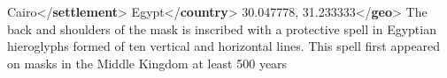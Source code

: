 \begin{shaded}
\hspace*{1em}\hspace*{1em}\hspace*{1em}Cairo{</\textbf{settlement}>}\mbox{}\newline 
\hspace*{1em}\hspace*{1em}\hspace*{1em}Egypt{</\textbf{country}>}\mbox{}\newline 
\hspace*{1em}\hspace*{1em}\hspace*{1em}\mbox{}\newline 
\hspace*{1em}\hspace*{1em}\hspace*{1em}\hspace*{1em}30.047778, 31.233333{</\textbf{geo}>}\mbox{}\newline 
\hspace*{1em}\hspace*{1em}\hspace*{1em}\mbox{}\newline 
\hspace*{1em}\hspace*{1em}\mbox{}\newline 
\hspace*{1em}\mbox{}\newline 
\hspace*{1em}\mbox{}\newline 
\hspace*{1em}\hspace*{1em}The back and shoulders of the mask is inscribed with a protective spell in Egyptian hieroglyphs formed of ten\mbox{}\newline 
\hspace*{1em}\hspace*{1em}\hspace*{1em}\hspace*{1em}\hspace*{1em}\hspace*{1em} vertical and horizontal lines. This spell first appeared on masks in the Middle Kingdom at least 500 years\mbox{}\newline 

\end{shaded}
